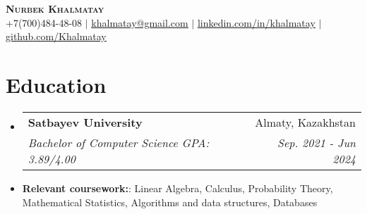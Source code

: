 \documentclass[letterpaper,11pt]{article}
\makeatletter
\newcommand{\resumeItem}[1]{
  \item\small{
    {#1 \vspace{-2pt}}
  }
}
\newcommand{\resumeSubheading}[4]{
  \vspace{-2pt}\item
    \begin{tabular*}{0.97\textwidth}[t]{l@{\extracolsep{\fill}}r}
      \textbf{#1} & #2 \\
      \textit{\small#3} & \textit{\small #4} \\
    \end{tabular*}\vspace{-7pt}
}
\newcommand{\resumeSubHeadingListStart}{\begin{itemize}[leftmargin=0.15in, label={}]}
\newcommand{\resumeSubHeadingListEnd}{\end{itemize}}
\makeatother
\begin{document}

\begin{center}
    \textbf{\Huge \scshape Nurbek Khalmatay} \\ \vspace{1pt}
    \small +7(700)484-48-08 $|$ \href{khalmatay@gmail.com}{\underline{khalmatay@gmail.com}} $|$ 
    \href{https://linkedin.com/in/khalmatay}{\underline{linkedin.com/in/khalmatay}} $|$
    \href{https://github.com/Khalmatay}{\underline{github.com/Khalmatay}}
\end{center}


\section{Education}
  \resumeSubHeadingListStart
    \resumeSubheading
      {Satbayev University}{Almaty, Kazakhstan}
      {Bachelor of Computer Science GPA: 3.89/4.00}{Sep. 2021 - Jun 2024}
    \resumeItem{\textbf{Relevant coursework:}: Linear Algebra, Calculus, Probability Theory, Mathematical Statistics, Algorithms and data structures, Databases}
\resumeSubHeadingListEnd

\end{document}
